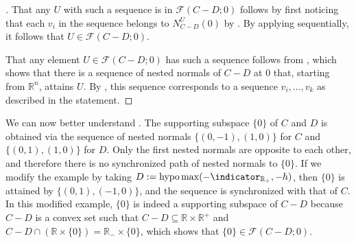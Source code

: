 \documentclass{article}
\theoremstyle{plain}
\theoremstyle{definition}
\theoremstyle{remark}
\begin{document}
\begin{proof}[\hypertarget{loc:characterization_of_the_faces_of_differences_of_convex_sets.proof}Proof of \Cref{loc:characterization_of_the_faces_of_differences_of_convex_sets.statement}]

That any $U$ with such a sequence is in $\mathcal{F}(C-D;0)$ follows by first noticing that each $v_i$ in the sequence belongs to
$N^U_{C-D}(0)$ by . By applying  sequentially, it follows that $U  \in \mathcal{F}(C-D;0)$.

That any element $U \in \mathcal{F}(C-D;0)$ has such a sequence follows from , which shows that there is a sequence of nested normals of $C-D$ at $0$ that, starting from $\mathbb{R}^n$, attains $U$. By , this sequence corresponds to a sequence $v_i,  \ldots , v_k$ as described in the statement.
\end{proof}
We can now better understand .
The supporting subspace $\{0\}$ of $C$ and $D$ is obtained via the sequence of nested normals
$\{(0,  -1), (1, 0)\}$ for $C$ and $\{(0, 1), (1, 0)\}$ for $D$. Only the
first nested normals are opposite to each other, and therefore there is no
synchronized path of nested normals to $\{0\}$. If we modify the example by
taking $D :=
\mathrm{hypo} \max(-\indicator_{\mathbb{R}_+},  - h)$,
then $\{0\}$ is attained by $\{(0, 1),  (-1, 0)\}$, and the sequence is
synchronized with that of $C$. In this modified example,
$\{0\}$ is indeed a supporting subspace of $C-D$ because $C-D$ is a convex set
such that
$C-D \subseteq \mathbb{R} \times  \mathbb{R}^+$ and $C-D \cap (\mathbb{R} \times \{0\}) = \mathbb{R}_{-} \times \{0\}$, which shows that $\{0\} \in \mathcal{F}(C-D;0)$.
\end{document}
